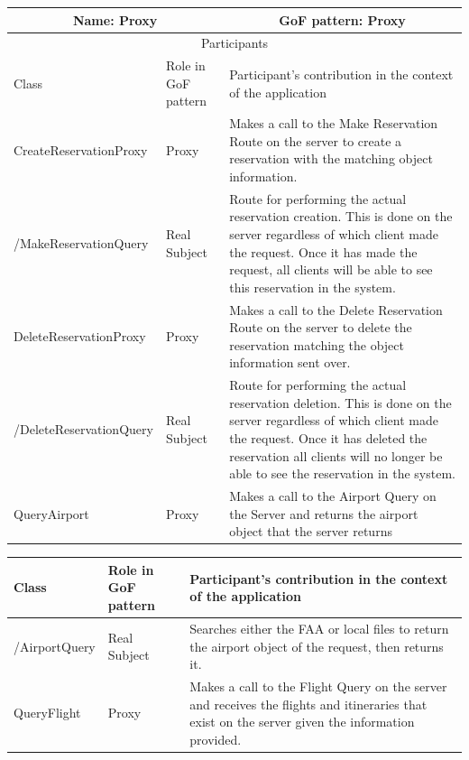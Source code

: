 \begin{center}
    \begin{tabular}{ |p{4cm}|p{4cm}|p{7cm}|  }
        \hline
        \multicolumn{2}{|c|}{Name: Proxy} & \multicolumn{1}{|c|}{GoF pattern: Proxy} \\
        \hline
        \multicolumn{3}{|c|}{Participants} \\
        \hline
        Class & Role in GoF pattern & Participant's contribution in the context of the application \\
        \hline \hline

        CreateReservationProxy & Proxy & Makes a call to the Make Reservation Route on the server to create a reservation with the matching object information.\\
        \hline
        /MakeReservationQuery & Real Subject & Route for performing the actual reservation creation. This is done on the server regardless of which client made the request. Once it has made the request, all clients will be able to see this reservation in the system.\\
        \hline
        DeleteReservationProxy & Proxy & Makes a call to the Delete Reservation Route on the server to delete the reservation matching the object information sent over.\\
        \hline
        /DeleteReservationQuery & Real Subject & Route for performing the actual reservation deletion. This is done on the server regardless of which client made the request. Once it has deleted the reservation all clients will no longer be able to see the reservation in the system.\\
        \hline
        QueryAirport & Proxy &
        Makes a call to the Airport Query on the Server and returns the airport object that the server returns
        \\
        \hline
    \end{tabular}
    \begin{tabular}{ |p{4cm}|p{4cm}|p{7cm}|  }
        \hline
        Class & Role in GoF pattern & Participant's contribution in the context of the application \\
        \hline \hline
        /AirportQuery & Real Subject &
        Searches either the FAA or local files to return the airport object of the request, then returns it.
        \\
        \hline
        QueryFlight & Proxy &
        Makes a call to the Flight Query on the server and receives the flights and itineraries that exist on the server given the information provided.

\end{tabular}
\end{center}
